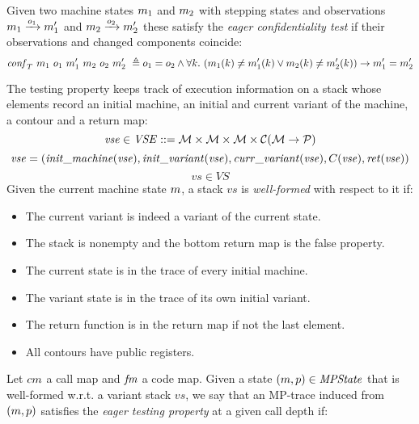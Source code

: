\documentclass[acmsmall,review,anonymous]{acmart}\settopmatter{printfolios=true,printccs=false,printacmref=false}
\begin{document}
  Given two machine states $m_1$ and $m_2$ with stepping states and
  observations $m_1 \xrightarrow{o_1} m_1'$ and $m_2
  \xrightarrow{o_2} m_2'$ these satisfy the \emph{eager confidentiality
  test} if their observations and changed components coincide:
  \[
    \mathit{conf}_T ~ m_1 ~ o_1 ~ m_1' ~ m_2 ~ o_2 ~ m_2' ~ \triangleq
    o_1 = o_2 \wedge \forall k . ~
   (     m_1(k) \neq m_1'(k)
    \vee m_2(k) \neq m_2'(k))
    \rightarrow m_1' = m_2'
  \]
\newcommand{\vse}{\mathit{vse}}
\newcommand{\VSES}{\mathit{VSE}}
\newcommand{\vs}{\mathit{vs}}
\newcommand{\VSS}{\mathit{VS}}

  The testing property keeps track of execution information on a stack whose
  elements record an initial machine, an initial and current variant of the
  machine, a contour and a return map:
  $$\vse \in \VSES ::= \MACHS \times \MACHS \times \MACHS \times \CONTOURS (\MACHS \rightarrow \mathcal{P})$$
  $$\vse = (\mathit{init\_machine}(\vse), \mathit{init\_variant}(\vse), \mathit{curr\_variant}(\vse), \contour(\vse), \mathit{ret}(\vse))$$
  $$\vs \in \VSS$$
  Given the current machine state $m$, a stack $\vs$ is \emph{well-formed}
  with respect to it if:
  \begin{itemize}
  \item The current variant is indeed a variant of the current state.
  \item The stack is nonempty and the bottom return map is the false property.
  \item The current state is in the trace of every initial machine.
  \item The variant state is in the trace of its own initial variant.
  \item The return function is in the return map if not the last element. 
  \item All contours have public registers.
  \end{itemize}

  Let $cm$ a call map and $\mathit{fm}$ a code map. Given a state
  $(m, p) \in \mathit{MPState}$ that is well-formed w.r.t. a variant stack $\vs$, we
  say that an MP-trace induced from $(m, p)$ satisfies the \emph{eager
  testing property} at a given call depth if:
\end{document}
